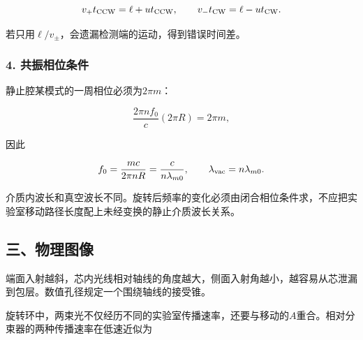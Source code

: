 \documentclass[12pt,a4paper,fontset=fandol]{ctexart}
\begin{document}
\[
v_+t_{\rm CCW}=\ell+ut_{\rm CCW},
\qquad
v_-t_{\rm CW}=\ell-ut_{\rm CW}.
\]

若只用\(\ell/v_\pm\)，会遗漏检测端的运动，得到错误时间差。

\subsubsection{4.
共振相位条件}\label{ux5171ux632fux76f8ux4f4dux6761ux4ef6}

静止腔某模式的一周相位必须为\(2\pi m\)：

\[
\frac{2\pi n f_0}{c}(2\pi R)=2\pi m,
\]

因此

\[
f_0=\frac{mc}{2\pi nR}
=\frac{c}{n\lambda_{m0}},
\qquad
\lambda_{\rm vac}=n\lambda_{m0}.
\]

介质内波长和真空波长不同。旋转后频率的变化必须由闭合相位条件求，不应把实验室移动路径长度配上未经变换的静止介质波长关系。

\subsection{三、物理图像}\label{ux4e09ux7269ux7406ux56feux50cf-5}

端面入射越斜，芯内光线相对轴线的角度越大，侧面入射角越小，越容易从芯泄漏到包层。数值孔径规定一个围绕轴线的接受锥。

\begin{center}
\begin{minipage}{\linewidth}
\centering\begingroup{}
\ifdim\wd\diagrambox>.88\linewidth
\sbox{\diagrambox}{\resizebox{.88\linewidth}{!}{\usebox{\diagrambox}}}\fi
\ifdim\ht\diagrambox>.38\textheight
\resizebox{!}{.38\textheight}{\usebox{\diagrambox}}
\else\usebox{\diagrambox}\fi
\par{}\endgroup\end{minipage}\end{center}

旋转环中，两束光不仅经历不同的实验室传播速率，还要与移动的\(A\)重合。相对分束器的两种传播速率在低速近似为
\end{document}
